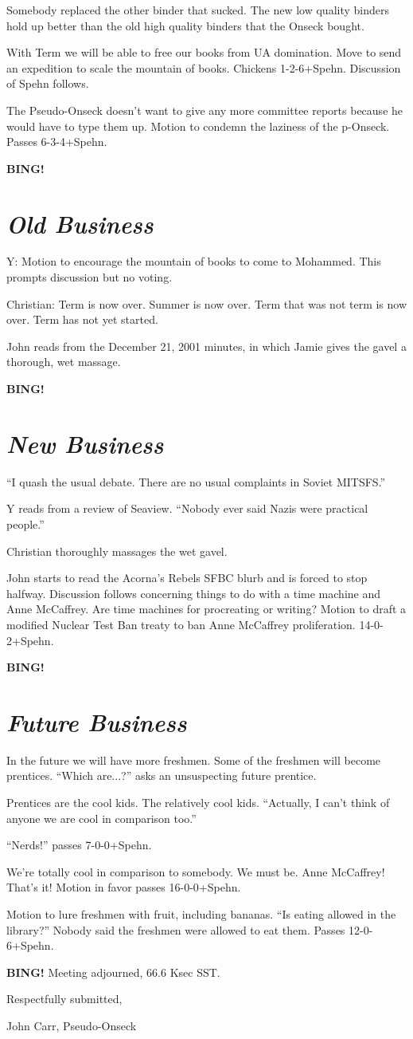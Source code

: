 \documentclass[10pt]{article}
\newcommand{\bing}{{\bf BING!} }
\newcommand{\goto}[1]{\bing \vskip 12pt \section*{{\em{#1}}}}
\begin{document}
Somebody replaced the other binder that sucked.  The new low quality
binders hold up better than the old high quality binders that the
Onseck bought.

With Term we will be able to free our books from UA domination.
Move to send an expedition to scale the mountain of books.
Chickens \hbox{1-2-6+Spehn}.  Discussion of Spehn follows.

The Pseudo-Onseck doesn't want to give any more committee reports
because he would have to type them up.  Motion to condemn the
laziness of the p-Onseck. Passes \hbox{6-3-4+Spehn}.

\goto{Old Business}

Y: Motion to encourage the mountain of books to come to Mohammed.
This prompts discussion but no voting.

Christian: Term is now over.  Summer is now over.  Term that was not
term is now over.  Term has not yet started.

John reads from the December 21, 2001 minutes, in which Jamie gives
the gavel a thorough, wet massage.

\goto{New Business}

``I quash the usual debate.  There are no usual complaints in
Soviet MITSFS.''

Y reads from a review of Seaview.  ``Nobody ever said Nazis were
practical people.''

Christian thoroughly massages the wet gavel.

John starts to read the Acorna's Rebels SFBC blurb and is forced to stop halfway.
Discussion follows concerning things to do with a time machine and Anne McCaffrey.
Are time machines for procreating or writing?
Motion to draft a modified Nuclear Test Ban treaty to ban
Anne McCaffrey proliferation.  \hbox{14-0-2+Spehn}.

\goto{Future Business}

In the future we will have more freshmen.  Some of the freshmen will
become prentices.  ``Which are...?'' asks an unsuspecting future prentice.

Prentices are the cool kids.  The relatively cool kids.
``Actually, I can't think of anyone we are cool in comparison too.''

``Nerds!'' passes \hbox{7-0-0+Spehn}.

We're totally cool in comparison to somebody.  We must be.
Anne McCaffrey!  That's it!  Motion in favor passes \hbox{16-0-0+Spehn}.

Motion to lure freshmen with fruit, including bananas.
``Is eating allowed in the library?''
Nobody said the freshmen were allowed to eat them.
Passes \hbox{12-0-6+Spehn}.

\bing
\noindent
Meeting adjourned, 66.6 Ksec SST.

\vspace{18pt}

\centerline{Respectfully submitted,}
\centerline{John Carr, Pseudo-Onseck}
\end{document}
